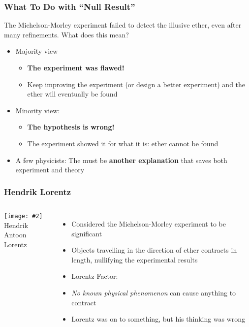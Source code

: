 \documentclass[12pt,compress,aspectratio=169]{beamer}
\newcommand{\pic}[2]{\texttt{[image: \#2]}}
\newcommand{\bigsqrt}{\ensuremath\sqrt{1-\left(\frac{v}{c}\right)^2}}
\newcommand{\lorentz}{\ensuremath\frac{1}{\bigsqrt}}
\newcommand{\eq}[2]{\vspace{#1}{\Large\begin{displaymath}#2\end{displaymath}}}
\begin{document}
\begin{frame}
  \frametitle{What To Do with ``Null Result''}
  The Michelson-Morley experiment failed to detect the illusive ether, even
  after many refinements. What does this mean?
  \begin{itemize}
  \item Majority view
    \begin{itemize}
    \item\textbf{The experiment was flawed!}
    \item Keep improving the experiment (or design a better experiment) and the
      ether will eventually be found
    \end{itemize}
  \item Minority view:
    \begin{itemize}
    \item\textbf{The hypothesis is wrong!}
    \item The experiment showed it for what it is: ether cannot be found
    \end{itemize}
  \item A few physicists: The must be \textbf{another explanation} that saves
    both experiment and theory
  \end{itemize}
\end{frame}

\begin{frame}
  \frametitle{Hendrik Lorentz}
  \begin{columns}
    
    \begin{center}
      \pic{1.2}{graphics/lorentz.jpg}\\
      {\footnotesize Hendrik Antoon Lorentz}
    \end{center}
    
    \begin{itemize}
    \item Considered the Michelson-Morley experiment to be significant
    \item Objects travelling in the direction of ether contracts in length,
      nullifying the experimental results
    \item Lorentz Factor:
      
      \eq{-.25in}{
        \boxed{\gamma=\lorentz}
      }
    \item \emph{No known physical phenomenon} can cause anything to contract
    \item Lorentz was on to something, but his thinking was wrong
    \end{itemize}
  \end{columns}
\end{frame}
\end{document}
